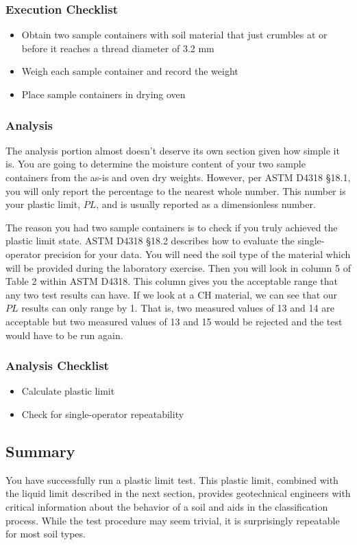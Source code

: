 \documentclass[12pt]{article}
\begin{document}
\subsubsection*{Execution Checklist}
\begin{itemize}
    \item Obtain two sample containers with soil material that just crumbles at or before it reaches a thread diameter of 3.2 mm
    \item Weigh each sample container and record the weight
    \item Place sample containers in drying oven
\end{itemize}

\subsubsection{Analysis}
The analysis portion almost doesn't deserve its own section given how simple it is. You are going to determine the moisture content of your two sample containers from the as-is and oven dry weights. However, per ASTM D4318 \S18.1, you will only report the percentage to the nearest whole number. This number is your plastic limit, $PL$, and is usually reported as a dimensionless number.

The reason you had two sample containers is to check if you truly achieved the plastic limit state. ASTM D4318 \S18.2 describes how to evaluate the single-operator precision for your data. You will need the soil type of the material which will be provided during the laboratory exercise. Then you will look in column 5 of Table 2 within ASTM D4318. This column gives you the acceptable range that any two test results can have. If we look at a CH material, we can see that our $PL$ results can only range by 1. That is, two measured values of 13 and 14 are acceptable but two measured values of 13 and 15 would be rejected and the test would have to be run again.
\subsubsection*{Analysis Checklist}
\begin{itemize}
    \item Calculate plastic limit
    \item Check for single-operator repeatability
\end{itemize}

\subsection{Summary}
You have successfully run a plastic limit test. This plastic limit, combined with the liquid limit described in the next section, provides geotechnical engineers with critical information about the behavior of a soil and aids in the classification process. While the test procedure may seem trivial, it is surprisingly repeatable for most soil types.
\end{document}
